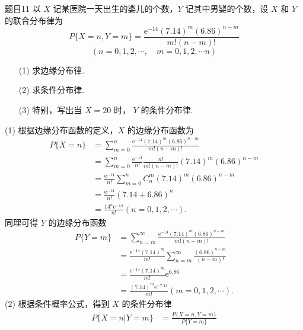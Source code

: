 \begin{question}{题目11}
    以 $X$ 记某医院一天出生的婴儿的个数，$Y$ 记其中男婴的个数，设 $X$ 和 $Y$ 的联合分布律为
    $$
        P\{X=n, Y=m\} = \frac{\mathrm{e}^{-14}(7.14)^m(6.86)^{n-m}}{m!(n-m)!}
    $$
    $$
        (n = 0, 1, 2, \cdots, \quad m = 0, 1, 2, \cdots n)
    $$
    \begin{itemize}
        \item [(1)] 求边缘分布律.
        \item [(2)] 求条件分布律.
        \item [(3)] 特别，写出当 $X=20$ 时， $Y$ 的条件分布律.
    \end{itemize}
\end{question}
\begin{solution}
    (1) 根据边缘分布函数的定义，$X$ 的边缘分布函数为
    $$
        \begin{aligned}
            P\{X=n\}
             & = \sum_{m=0}^{n} \frac{\mathrm{e}^{-14}(7.14)^m(6.86)^{n-m}}{m!(n-m)!}               \\
             & = \sum_{m=0}^{n} \frac{\mathrm{e}^{-14}}{n!} \frac{n!}{m!(n-m)!}(7.14)^m(6.86)^{n-m} \\
             & = \frac{\mathrm{e}^{-14}}{n!} \sum_{m=0}^{n} C_n^m (7.14)^m(6.86)^{n-m}              \\
             & = \frac{\mathrm{e}^{-14}}{n!} (7.14+6.86)^n                                          \\
             & = \frac{14^n \mathrm{e}^{-14}}{n!}
            (n = 0, 1, 2, \cdots).
        \end{aligned}
    $$
    同理可得 $Y$ 的边缘分布函数
    $$
        \begin{aligned}
            P\{Y=m\}
             & = \sum_{n=m}^{\infty} \frac{\mathrm{e}^{-14}(7.14)^m(6.86)^{n-m}}{m!(n-m)!}           \\
             & = \frac{\mathrm{e}^{-14}(7.14)^m}{m!} \sum_{n=m}^{\infty} \frac{(6.86)^{n-m}}{(n-m)!} \\
             & = \frac{\mathrm{e}^{-14}(7.14)^m}{m!} \mathrm{e}^{6.86}                               \\
             & = \frac{(7.14)^m\mathrm{e}^{-7.14}}{m!}
            (m = 0, 1, 2, \cdots).
        \end{aligned}
    $$
    (2) 根据条件概率公式，得到 $X$ 的条件分布律
    $$
        \begin{aligned}
            P\{X=n | Y=m\}
             & = \frac{P\{X=n,Y=m\}}{P\{Y=m\}}                                                                              \\

\end{aligned}$$
\end{solution}
